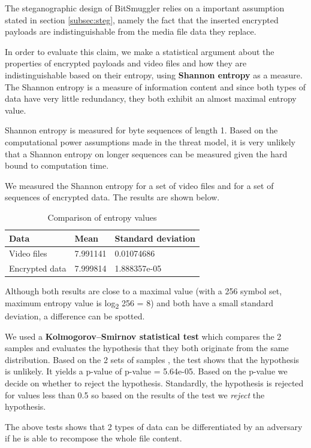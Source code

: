 \documentclass[11pt]{article} %
\newcommand{\projectName}{BitSmuggler }
\begin{document}
The steganographic design of \projectName relies on a important assumption stated in section \ref{subsec:steg}, namely the fact that the inserted encrypted payloads are indistinguishable from the media file data they replace.

In order to evaluate this claim, we make a statistical argument about the properties of encrypted payloads and video files and how they are indistinguishable based on their entropy, using \textbf{Shannon entropy} as a measure. The Shannon entropy is a measure of information content and since both types of data have very little redundancy, they both exhibit an almost maximal entropy value.

Shannon entropy is measured for byte sequences of length 1. Based on the computational power assumptions made in the threat model, it is very unlikely that a Shannon entropy on longer sequences can be measured  given the hard bound to computation time.

We measured the Shannon entropy for a set of video files and for a set of sequences of encrypted data. The results are shown below.

\begin{table}
    \begin{tabular}{|l|l|l|}
    \hline
    Data           & Mean     & Standard deviation \\ \hline
    Video files    & 7.991141 & 0.01074686         \\ \hline
    Encrypted data & 7.999814 & 1.888357e-05       \\ \hline
    \end{tabular}
    \caption{Comparison of entropy values}
\end{table}

Although both results are close to a maximal value (with a 256 symbol set, maximum entropy value is log\textsubscript{2} 256 = 8) and both have a small standard deviation, a difference can be spotted.

We used a \textbf{Kolmogorov–Smirnov statistical test} which compares the 2 samples and evaluates the hypothesis that they both originate from the same distribution. Based on the 2 sets of samples , the test shows that the hypothesis is unlikely. It yields a p-value of  p-value = 5.64e-05. Based on the p-value we decide on whether to reject the hypothesis. Standardly, the hypothesis is rejected for values less than 0.5 so based on the results of the test we \textit{reject} the hypothesis.

The above tests shows that 2 types of data can be differentiated by an adversary if he is able to recompose the whole file content.
\end{document}

